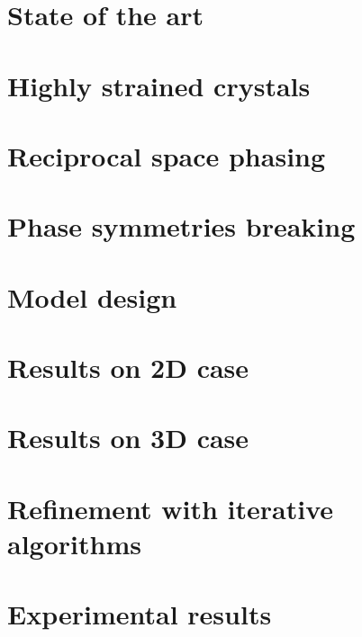 \chapter{State of the art}\label{chp:phasing}
\chapter{Highly strained crystals}\label{chp:phasing}
\chapter{Reciprocal space phasing}\label{chp:phasing}
\chapter{Phase symmetries breaking}\label{chp:phasing}
\chapter{Model design}\label{chp:phasing}
\chapter{Results on 2D case}\label{chp:phasing}
\chapter{Results on 3D case}\label{chp:phasing}
\chapter{Refinement with iterative algorithms}\label{chp:phasing}
\chapter{Experimental results}\label{chp:phasing}

